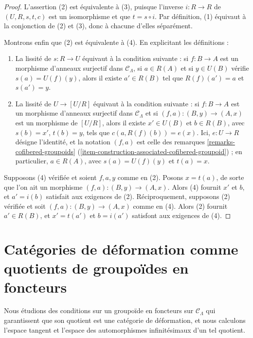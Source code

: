 \begin{proof}
L'assertion (2) est équivalente à (3), puisque l'inverse $i: R \to R$ de
$(U, R, s, t, c)$ est un isomorphisme et que $t = s \circ i$. Par définition,
(1) équivaut à la conjonction de (2) et (3), donc à chacune d'elles séparément.

\medskip\noindent
Montrons enfin que (2) est équivalente à (4). En explicitant les définitions :
\begin{enumerate}
\item[(2)] La lissité de $s: R \to U$ équivaut à la condition suivante : si
$f: B \to A$ est un morphisme d'anneaux surjectif dans
$\mathcal{C}_\Lambda$, si $a \in R(A)$ et si $y \in U(B)$ vérifie
$s(a) = U(f)(y)$, alors il existe $a' \in R(B)$ tel que
$R(f)(a') = a$ et $s(a') = y$.
\item[(4)] La lissité de $U \to [U/R]$ équivaut à la condition suivante : si
$f: B \to A$ est un morphisme d'anneaux surjectif dans
$\mathcal{C}_\Lambda$ et si $(f, a) : (B, y) \to (A, x)$ est un morphisme de
$[U/R]$, alors il existe $x' \in U(B)$ et $b \in R(B)$, avec
$s(b) = x'$, $t(b) = y$, tels que $c(a, R(f)(b)) = e(x)$. Ici,
$e : U \to R$ désigne l'identité, et la notation $(f, a)$ est celle des
remarques \ref{remarks-cofibered-groupoids}
(\ref{item-construction-associated-cofibered-groupoid}) ; en particulier,
$a \in R(A)$, avec $s(a) = U(f)(y)$ et $t(a) = x$.
\end{enumerate}
Supposons (4) vérifiée et soient $f, a, y$ comme en (2). Posons $x = t(a)$,
de sorte que l'on ait un morphisme $(f, a): (B, y) \to (A, x)$. Alors (4)
fournit $x'$ et $b$, et $a' = i(b)$ satisfait aux exigences de (2).
Réciproquement, supposons (2) vérifiée et soit
$(f, a): (B, y) \to (A, x)$ comme en (4). Alors (2) fournit
$a' \in R(B)$, et $x' = t(a')$ et $b = i(a')$ satisfont aux exigences de (4).
\end{proof}





\section{Catégories de déformation comme quotients de groupoïdes en foncteurs}
\label{section-deformation-categories-as-quotients}

\noindent
Nous étudions des conditions sur un groupoïde en foncteurs sur
$\mathcal{C}_\Lambda$ qui garantissent que son quotient est une catégorie de
déformation, et nous calculons l'espace tangent et l'espace des automorphismes
infinitésimaux d'un tel quotient.

